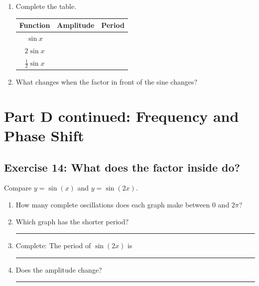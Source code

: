 \documentclass[11pt,a4paper]{article}
\newcommand{\answerline}[1][4cm]{\rule{#1}{0.4pt}}
\begin{document}
\begin{enumerate}[label=\alph*)]
\item Complete the table.

\begin{center}
\renewcommand{\arraystretch}{1.5}
\begin{tabular}{c|c|c}
\toprule
Function & Amplitude & Period\\
\midrule
$\sin x$ & & \\
$2\sin x$ & & \\
$\frac12\sin x$ & & \\
\bottomrule
\end{tabular}
\end{center}

\item What changes when the factor in front of the sine changes?
\end{enumerate}

\newpage


\section*{Part D continued: Frequency and Phase Shift}

\subsection*{Exercise 14: What does the factor inside do?}
Compare $y=\sin(x)$ and $y=\sin(2x)$.

\begin{center}
\end{center}

\begin{enumerate}[label=\alph*)]
\item How many complete oscillations does each graph make between $0$ and $2\pi$?
\item Which graph has the shorter period? \answerline
\item Complete: The period of $\sin(2x)$ is \answerline
\item Does the amplitude change? \answerline
\end{enumerate}
\end{document}
